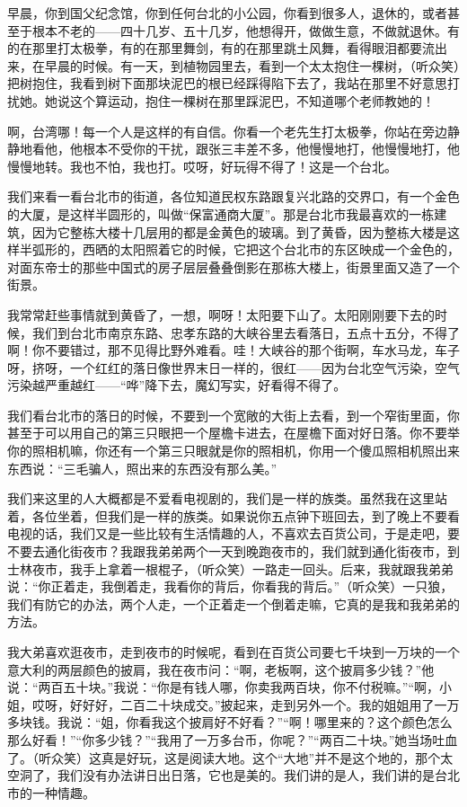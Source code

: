 \par 早晨，你到国父纪念馆，你到任何台北的小公园，你看到很多人，退休的，或者甚至于根本不老的——四十几岁、五十几岁，他想得开，做做生意，不做就退休。有的在那里打太极拳，有的在那里舞剑，有的在那里跳土风舞，看得眼泪都要流出来，在早晨的时候。有一天，到植物园里去，看到一个太太抱住一棵树，（听众笑）把树抱住，我看到树下面那块泥巴的根已经踩得陷下去了，我站在那里不好意思打扰她。她说这个算运动，抱住一棵树在那里踩泥巴，不知道哪个老师教她的！
\par 啊，台湾哪！每一个人是这样的有自信。你看一个老先生打太极拳，你站在旁边静静地看他，他根本不受你的干扰，跟张三丰差不多，他慢慢地打，他慢慢地打，他慢慢地转。我也不怕，我也打。哎呀，好玩得不得了！这是一个台北。
\par 我们来看一看台北市的街道，各位知道民权东路跟复兴北路的交界口，有一个金色的大厦，是这样半圆形的，叫做“保富通商大厦”。那是台北市我最喜欢的一栋建筑，因为它整栋大楼十几层用的都是金黄色的玻璃。到了黄昏，因为整栋大楼是这样半弧形的，西晒的太阳照着它的时候，它把这个台北市的东区映成一个金色的，对面东帝士的那些中国式的房子层层叠叠倒影在那栋大楼上，街景里面又造了一个街景。
\par 我常常赶些事情就到黄昏了，一想，啊呀！太阳要下山了。太阳刚刚要下去的时候，我们到台北市南京东路、忠孝东路的大峡谷里去看落日，五点十五分，不得了啊！你不要错过，那不见得比野外难看。哇！大峡谷的那个街啊，车水马龙，车子呀，挤呀，一个红红的落日像世界末日一样的，很红——因为台北空气污染，空气污染越严重越红——“哗”降下去，魔幻写实，好看得不得了。
\par 我们看台北市的落日的时候，不要到一个宽敞的大街上去看，到一个窄街里面，你甚至于可以用自己的第三只眼把一个屋檐卡进去，在屋檐下面对好日落。你不要举你的照相机嘛，你还有一个第三只眼就是你的照相机，你用一个傻瓜照相机照出来东西说：“三毛骗人，照出来的东西没有那么美。”
\par 我们来这里的人大概都是不爱看电视剧的，我们是一样的族类。虽然我在这里站着，各位坐着，但我们是一样的族类。如果说你五点钟下班回去，到了晚上不要看电视的话，我们又是一些比较有生活情趣的人，不喜欢去百货公司，于是走吧，要不要去通化街夜市？我跟我弟弟两个一天到晚跑夜市的，我们就到通化街夜市，到士林夜市，我手上拿着一根棍子，（听众笑）一路走一回头。后来，我就跟我弟弟说：“你正着走，我倒着走，我看你的背后，你看我的背后。”（听众笑）一只狼，我们有防它的办法，两个人走，一个正着走一个倒着走嘛，它真的是我和我弟弟的方法。
\par 我大弟喜欢逛夜市，走到夜市的时候呢，看到在百货公司要七千块到一万块的一个意大利的两层颜色的披肩，我在夜市问：“啊，老板啊，这个披肩多少钱？”他说：“两百五十块。”我说：“你是有钱人哪，你卖我两百块，你不付税嘛。”“啊，小姐，哎呀，好好好，二百二十块成交。”披起来，走到另外一个。我的姐姐用了一万多块钱。我说：“姐，你看我这个披肩好不好看？”“啊！哪里来的？这个颜色怎么那么好看！”“你多少钱？”“我用了一万多台币，你呢？”“两百二十块。”她当场吐血了。（听众笑）这真是好玩，这是阅读大地。这个“大地”并不是这个地的，那个太空洞了，我们没有办法讲日出日落，它也是美的。我们讲的是人，我们讲的是台北市的一种情趣。
